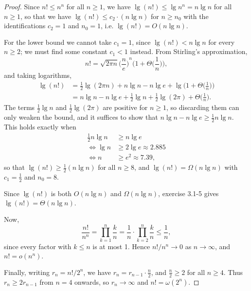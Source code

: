\begin{proof}
  Since $n! \leq n^n$ for all $n \geq 1$, we have $\lg{(n!)} \leq
  \lg{n^n} = n\lg{n}$
  for all $n \geq 1$, so that we have $\lg{(n!)} \leq c_2 \cdot (n\lg{n})$ for
  $n \geq n_0$ with the identifications $c_2 = 1$ and $n_0 = 1$, i.e.
  $\lg{(n!)} = O(n\lg{n})$.

  For the lower bound we cannot take $c_1 = 1$, since $\lg{(n!)} < n\lg{n}$ for
  every $n \geq 2$; we must find some constant $c_1 < 1$ instead. From
  Stirling's approximation,
  \[
    n! = \sqrt{2\pi n} {\biggl(\frac{n}{e}\biggr)}^n
    \biggl(1 + \Theta \biggl(\frac{1}{n}\biggr)\biggr),
  \]
  and taking logarithms,
  \begin{equation*}
    \begin{split}
      \lg{(n!)} &= \frac{1}{2}\lg{(2\pi n)} + n\lg{n} - n\lg{e}
      + \lg{\biggl(1 + \Theta\biggl(\frac{1}{n}\biggr)\biggr)} \\
      &= n\lg{n} - n\lg{e} + \frac{1}{2}\lg{n} + \frac{1}{2}\lg{(2\pi)}
      + \Theta\biggl(\frac{1}{n}\biggr).
    \end{split}
  \end{equation*}
  The terms $\frac{1}{2}\lg{n}$ and $\frac{1}{2}\lg{(2\pi)}$ are positive for
  $n \geq 1$, so discarding them can only weaken the bound, and it suffices to
  show that $n\lg{n} - n\lg{e} \geq \frac{1}{2}n\lg{n}$. This holds exactly when
  \begin{equation*}
    \begin{split}
      \frac{1}{2}n\lg{n} &\geq n\lg{e} \\
      \Leftrightarrow \lg{n} &\geq 2\lg{e} \approx 2.885 \\
      \Leftrightarrow n &\geq e^2 \approx 7.39,
    \end{split}
  \end{equation*}
  so that $\lg{(n!)} \geq \frac{1}{2}(n\lg{n})$ for all $n \geq 8$, and
  $\lg{(n!)} = \Omega(n\lg{n})$ with $c_1 = \frac{1}{2}$ and $n_0 = 8$.

  Since $\lg{(n!)}$ is both $O(n\lg{n})$ and $\Omega(n\lg{n})$, exercise 3.1-5
  gives $\lg{(n!)} = \Theta(n\lg{n})$.

  Now,
  \[
    \frac{n!}{n^n} = \prod_{k = 1}^n \frac{k}{n}
    = \frac{1}{n} \cdot \prod_{k = 2}^n \frac{k}{n} \leq \frac{1}{n},
  \]
  since every factor with $k \leq n$ is at most 1. Hence $n!/n^n \to 0$ as
  $n \to \infty$, and $n! = o(n^n)$.

  Finally, writing $r_n = n!/2^n$, we have $r_n = r_{n - 1} \cdot \frac{n}{2}$,
  and $\frac{n}{2} \geq 2$ for all $n \geq 4$. Thus $r_n \geq 2r_{n-1}$ from
  $n = 4$ onwards, so $r_n \to \infty$ and $n! = \omega(2^n)$.
\end{proof}
